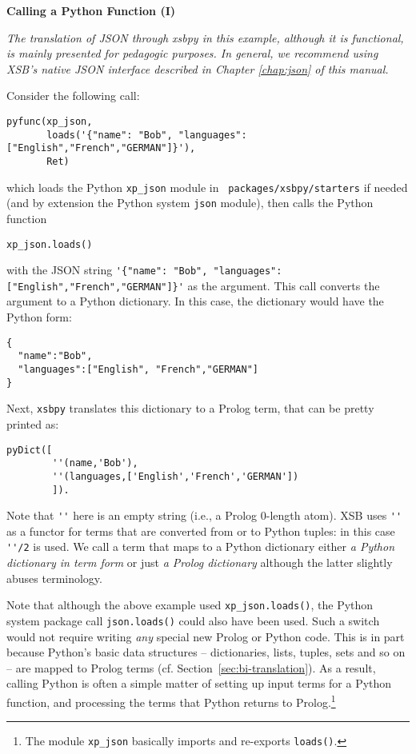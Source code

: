 \begin{example} \rm {\bf Calling a Python Function (I)}

  {{\em The translation of JSON through xsbpy in this example,
      although it is functional, is mainly presented for pedagogic
      purposes.  In general, we recommend using XSB's native JSON
      interface described in Chapter \ref{chap:json} of this manual.
  }}

  
\noindent  
Consider the following call:

 \begin{verbatim}
pyfunc(xp_json,
       loads('{"name": "Bob", "languages": ["English","French","GERMAN"]}'),
       Ret)
\end{verbatim}
 
\noindent 
which loads the Python {\tt xp\_json} module in {\tt
  packages/xsbpy/starters} if needed (and by extension the Python
system {\tt json} module), then calls the Python function

{\tt xp\_json.loads()}

\noindent
with the JSON string
\verb|'{"name": "Bob", "languages": ["English","French","GERMAN"]}'|
as the argument.
This call converts the argument to a Python
dictionary.  In this case, the dictionary would have the Python form:
\begin{verbatim}
{
  "name":"Bob",
  "languages":["English", "French","GERMAN"]
}
\end{verbatim}
Next,
{\tt xsbpy} translates this dictionary to a Prolog term, that can
be pretty printed as:
\begin{verbatim}
pyDict([
        ''(name,'Bob'),
        ''(languages,['English','French','GERMAN'])
        ]).
\end{verbatim}
Note that \verb|''| here is an empty string (i.e., a Prolog 0-length
atom).  XSB uses \verb|''| as a functor for terms that are converted
from or to Python tuples: in this case \verb|''/2| is used.  We call a
term that maps to a Python dictionary either {\em a Python dictionary
  in term form} or just {\em a Prolog dictionary} although the latter
slightly abuses terminology.
\end{example}

Note that although the above example used {\tt xp\_json.loads()}, the
Python system package call {\tt json.loads()} could also have been
used.  Such a switch would not require writing {\em any} special
new Prolog or Python code.  This is in part because Python's basic data
structures -- dictionaries, lists, tuples, sets and so on -- are
mapped to Prolog terms (cf. Section~\ref{sec:bi-translation}).  As a
result, calling Python is often a simple matter of setting up input
terms for a Python function, and processing the terms that Python
returns to Prolog.\footnote{The module {\tt xp\_json} basically
  imports and re-exports {\tt loads()}.}

